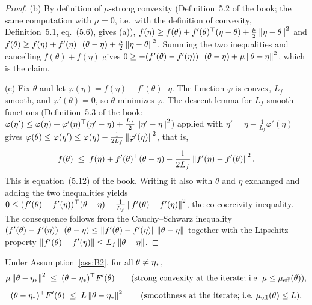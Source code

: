 \begin{proof}
(b) By definition of $\mu$-strong convexity (Definition~5.2 of the book; the same computation with $\mu=0$,
i.e.\ with the definition of convexity, Definition~5.1, eq.~(5.6), gives (a)),
$f(\eta)\ge f(\theta)+f'(\theta)^\top(\eta-\theta)+\frac\mu2\left\|\eta-\theta\right\|^2$ and
$f(\theta)\ge f(\eta)+f'(\eta)^\top(\theta-\eta)+\frac\mu2\left\|\eta-\theta\right\|^2$. Summing the two
inequalities and cancelling $f(\theta)+f(\eta)$ gives
$0\ge -(f'(\theta)-f'(\eta))^\top(\theta-\eta)+\mu\left\|\theta-\eta\right\|^2$, which is the claim.

(c) Fix $\theta$ and let $\varphi(\eta)=f(\eta)-f'(\theta)^\top\eta$. The function $\varphi$ is convex,
$L_f$-smooth, and $\varphi'(\theta)=0$, so $\theta$ minimizes $\varphi$. The descent lemma for
$L_f$-smooth functions (Definition~5.3 of the book: $\varphi(\eta')\le\varphi(\eta)+\varphi'(\eta)^\top(\eta'-\eta)+\frac{L_f}2\left\|\eta'-\eta\right\|^2$)
applied with $\eta'=\eta-\frac1{L_f}\varphi'(\eta)$ gives
$\varphi(\theta)\le\varphi(\eta')\le\varphi(\eta)-\frac1{2L_f}\left\|\varphi'(\eta)\right\|^2$, that is,
\[
f(\theta)\;\le\; f(\eta)+f'(\theta)^\top(\theta-\eta)-\frac1{2L_f}\left\|f'(\eta)-f'(\theta)\right\|^2 .
\]
This is equation~(5.12) of the book. Writing it also with $\theta$ and $\eta$ exchanged and adding the two
inequalities yields $0\le (f'(\theta)-f'(\eta))^\top(\theta-\eta)-\frac1{L_f}\left\|f'(\theta)-f'(\eta)\right\|^2$,
the co-coercivity inequality. The consequence follows from the Cauchy--Schwarz inequality
$(f'(\theta)-f'(\eta))^\top(\theta-\eta)\le\left\|f'(\theta)-f'(\eta)\right\|\left\|\theta-\eta\right\|$ together with the
Lipschitz property $\left\|f'(\theta)-f'(\eta)\right\|\le L_f\left\|\theta-\eta\right\|$.
\end{proof}

\begin{lemma}\label{lem:B2-mueff}
Under Assumption~\ref{ass:B2}, for all $\theta\neq\eta_\ast$,
\begin{equation}\label{ineq:mueff-lower}
\mu\left\|\theta-\eta_\ast\right\|^2\;\le\;(\theta-\eta_\ast)^\top F'(\theta)
\qquad\text{(strong convexity at the iterate; i.e.\ } \mu\le\mu_{\mathrm{eff}}(\theta)),
\end{equation}
\begin{equation}\label{ineq:mueff-upper}
(\theta-\eta_\ast)^\top F'(\theta)\;\le\;L\left\|\theta-\eta_\ast\right\|^2
\qquad\text{(smoothness at the iterate; i.e.\ } \mu_{\mathrm{eff}}(\theta)\le L).
\end{equation}
\end{lemma}

